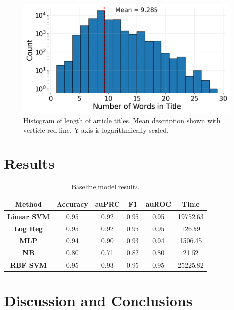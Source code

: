 \documentclass[12pt]{article}
\begin{document}
    \begin{figure}[htbp]
        \centerline{\includegraphics[scale=1]{../results/length_of_description.png}}
        \caption{Histogram of length of article titles. Mean description shown with verticle red line. Y-axis is logarithmically scaled.}
        \label{fig:1}
\end{figure}

	\section{Results}
	
    
    
    \begin{table}[]
    \centering
    \begin{tabular}{|c|c|c|c|c|c|}
    \hline
    \textbf{Method} & \textbf{Accuracy} & \textbf{auPRC} & \textbf{F1} &                             \textbf{auROC} & \textbf{Time} \\ \hline
    \textbf{Linear SVM} & 0.95 & 0.92 & 0.95 & 0.95 & 19752.63 \\ \hline
    \textbf{Log Reg}    & 0.95 & 0.92 & 0.95 & 0.95 & 126.59   \\ \hline
    \textbf{MLP}        & 0.94 & 0.90 & 0.93 & 0.94 & 1506.45  \\ \hline
    \textbf{NB}         & 0.80 & 0.71 & 0.82 & 0.80 & 21.52    \\ \hline
    \textbf{RBF SVM}    & 0.95 & 0.93 & 0.95 & 0.95 & 25225.82 \\ \hline
    \end{tabular}
    \caption{Baseline model results.}
    \label{table:2}
    \end{table} 
    
	
	\section{Discussion and Conclusions}
	
    \lipsum[5]	
    
    
    \newpage
    \nocite{*}
     
    
	
\end{document}
